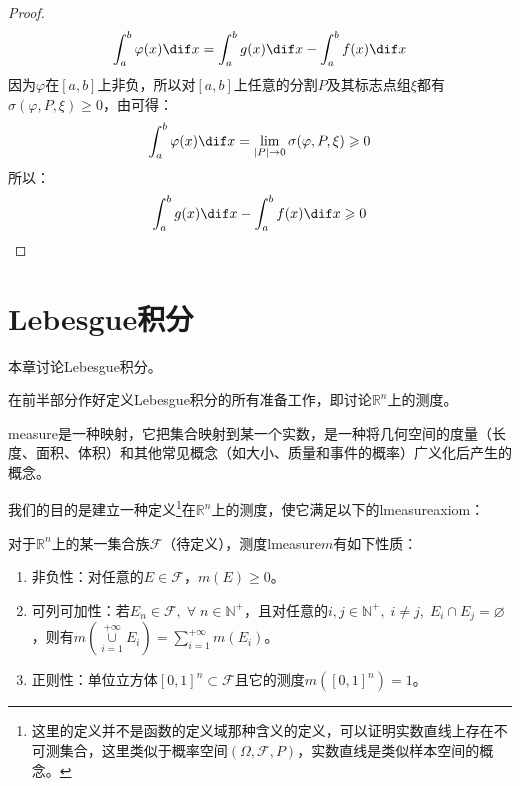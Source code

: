 \begin{proof}
	\begin{equation*}
		\int_{a}^b\varphi(x)\dif x=\int_{a}^bg(x)\dif x-\int_{a}^bf(x)\dif x
	\end{equation*}
	因为$\varphi$在$[a,b]$上非负，所以对$[a,b]$上任意的分割$P$及其标志点组$\xi$都有$\sigma(\varphi,P,\xi)\geqslant0$，由可得：
	\begin{equation*}
		\int_{a}^b\varphi(x)\dif x=\lim_{|P|\to0}\sigma(\varphi,P,\xi)\geqslant0
	\end{equation*}
	所以：
	\begin{equation*}
		\int_{a}^bg(x)\dif x-\int_{a}^bf(x)\dif x\geqslant0
	\end{equation*}\par
\end{proof}

\chapter{Lebesgue积分}
本章讨论Lebesgue积分。\par
在前半部分作好定义Lebesgue积分的所有准备工作，即讨论$\mathbb{R}^n$上的测度。\par
\gls{measure}是一种映射，它把集合映射到某一个实数，是一种将几何空间的度量（长度、面积、体积）和其他常见概念（如大小、质量和事件的概率）广义化后产生的概念。\par
我们的目的是建立一种定义\footnote{这里的定义并不是函数的定义域那种含义的定义，可以证明实数直线上存在不可测集合，这里类似于概率空间$(\Omega,\mathcal{F},P)$，实数直线是类似样本空间的概念。}在$\mathbb{R}^n$上的测度，使它满足以下的\gls{lmeasureaxiom}：
\begin{axiom}\label{axi:Lebesguem}
	对于$\mathbb{R}^n$上的某一集合族$\mathcal{F}$（待定义\label{sec:lebesgue可测集合族}），测度\gls{lmeasure}$m$有如下性质：
	\begin{enumerate}
		\item 非负性：对任意的$ E\in\mathcal{F}$，$m(E)\geqslant0$。
		\item 可列可加性：若$E_n\in\mathcal{F},\;\forall\;n\in\mathbb{N}^+$，且对任意的$i,j\in\mathbb{N}^+,\;i\ne j,\;E_i\cap E_j=\varnothing$，则有$m(\underset{i=1}{\overset{+\infty}{\cup}} E_i)=\sum\limits_{i=1}^{+\infty}m(E_i)$。
		\item 正则性：单位立方体$[0,1]^n\subset\mathcal{F}$且它的测度$m([0,1]^n)=1$。
	\end{enumerate}
\end{axiom}





